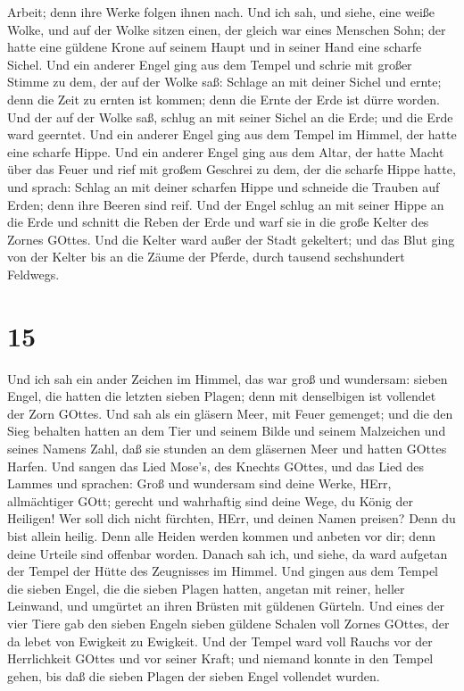 Arbeit; denn ihre Werke folgen ihnen nach.  Und ich sah,
und siehe, eine weiße Wolke, und auf der Wolke sitzen einen, der gleich
war eines Menschen Sohn; der hatte eine güldene Krone auf seinem Haupt
und in seiner Hand eine scharfe Sichel.  Und ein anderer
Engel ging aus dem Tempel und schrie mit großer Stimme zu dem, der auf
der Wolke saß: Schlage an mit deiner Sichel und ernte; denn die Zeit zu
ernten ist kommen; denn die Ernte der Erde ist dürre worden.
 Und der auf der Wolke saß, schlug an mit seiner Sichel an
die Erde; und die Erde ward geerntet.  Und ein anderer
Engel ging aus dem Tempel im Himmel, der hatte eine scharfe Hippe.
 Und ein anderer Engel ging aus dem Altar, der hatte Macht
über das Feuer und rief mit großem Geschrei zu dem, der die scharfe
Hippe hatte, und sprach: Schlag an mit deiner scharfen Hippe und
schneide die Trauben auf Erden; denn ihre Beeren sind reif.
 Und der Engel schlug an mit seiner Hippe an die Erde und
schnitt die Reben der Erde und warf sie in die große Kelter des Zornes
GOttes.  Und die Kelter ward außer der Stadt gekeltert; und
das Blut ging von der Kelter bis an die Zäume der Pferde, durch tausend
sechshundert Feldwegs.

\hypertarget{section-13}{%
\section{15}\label{section-13}}

 Und ich sah ein ander Zeichen im Himmel, das war groß und
wundersam: sieben Engel, die hatten die letzten sieben Plagen; denn mit
denselbigen ist vollendet der Zorn GOttes.  Und sah als ein
gläsern Meer, mit Feuer gemenget; und die den Sieg behalten hatten an
dem Tier und seinem Bilde und seinem Malzeichen und seines Namens Zahl,
daß sie stunden an dem gläsernen Meer und hatten GOttes Harfen.
 Und sangen das Lied Mose's, des Knechts GOttes, und das
Lied des Lammes und sprachen: Groß und wundersam sind deine Werke, HErr,
allmächtiger GOtt; gerecht und wahrhaftig sind deine Wege, du König der
Heiligen!  Wer soll dich nicht fürchten, HErr, und deinen
Namen preisen? Denn du bist allein heilig. Denn alle Heiden werden
kommen und anbeten vor dir; denn deine Urteile sind offenbar worden.
 Danach sah ich, und siehe, da ward aufgetan der Tempel der
Hütte des Zeugnisses im Himmel.  Und gingen aus dem Tempel
die sieben Engel, die die sieben Plagen hatten, angetan mit reiner,
heller Leinwand, und umgürtet an ihren Brüsten mit güldenen Gürteln.
 Und eines der vier Tiere gab den sieben Engeln sieben
güldene Schalen voll Zornes GOttes, der da lebet von Ewigkeit zu
Ewigkeit.  Und der Tempel ward voll Rauchs vor der
Herrlichkeit GOttes und vor seiner Kraft; und niemand konnte in den
Tempel gehen, bis daß die sieben Plagen der sieben Engel vollendet
wurden.

